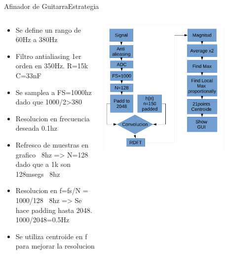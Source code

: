 \begin{frame}[t]{Afinador de Guitarra}{Estrategia}
   \footnotesize
   \begin{columns}
      \begin{column}{.5\textwidth}
         \begin{itemize}
            \item{Se define un rango de 60Hz a 380Hz}
            \item{Filtro antialiasing 1er orden en 350Hz. R=15k C=33nF}
            \item{Se samplea a FS=1000hz dado que 1000/2>380}
            \item{Resolucion en frecuencia deseada 0.1hz}
            \item{Refresco de muestras en grafico ~8hz => N=128 dado que a 1k son 128msegs ~8hz}
            \item{Resolucion en f=fs/N = 1000/128 ~8hz => Se hace padding hasta 2048. 1000/2048=0.5Hz}
            \item{Se utiliza centroide en f para mejorar la resolucion}
         \end{itemize}
      \end{column}
      \begin{column}{.5\textwidth}
         \center\includegraphics[width=0.8\textwidth]{7_clase/bloques}
      \end{column}
   \end{columns}
   \vfill
   \note{
      \begin{itemize}
         \item{}
         \item{}
      \end{itemize}
   }
\end{frame}
